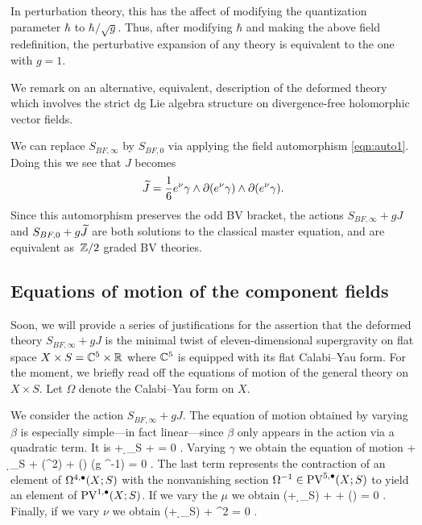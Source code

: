 In perturbation theory, this has the affect of modifying the quantization parameter $\hbar$ to $\hbar / \sqrt{g}$.
Thus, after modifying $\hbar$ and making the above field redefinition, the perturbative expansion of any theory is equivalent to the one with $g = 1$. 

\parsec[s:altdfn]

We remark on an alternative, equivalent, description of the deformed theory which involves the strict dg Lie algebra structure on divergence-free holomorphic vector fields.

We can replace $S_{BF,\infty}$ by $S_{BF,0}$ via applying the field automorphism \eqref{eqn:auto1}.
Doing this we see that $J$ becomes 
\[
\widetilde{J} = \frac16 e^\nu \gamma \wedge \partial (e^\nu \gamma) \wedge \partial(e^\nu \gamma) .
\]
Since this automorphism preserves the odd BV bracket, the actions $S_{BF,\infty} + g J$ and $S_{BF, 0} + g \widetilde{J}$ are both solutions to the classical master equation, and are equivalent as~$\mathbb Z/2$ graded BV theories.

\subsection{Equations of motion of the component fields} \label{s:components}

Soon, we will provide a series of justifications for the assertion that the deformed theory $S_{BF, \infty} + g J$ is the minimal twist of eleven-dimensional supergravity on flat space $X \times S = \mathbb C^5 \times \mathbb R$ where $\mathbb C^5$ is equipped with its flat Calabi--Yau form. 
For the moment, we briefly read off the equations of motion of the general theory on $X \times S$.
Let $\Omega$ denote the Calabi--Yau form on $X$. 

We consider the action $S_{BF, \infty} + gJ$.
The equation of motion obtained by varying $\beta$ is especially simple---in fact linear---since $\beta$ only appears in the action via a quadratic term. 
It is
\beqn\label{eqn:eombeta}
\dbar \nu + \d_S \nu + \div \mu = 0 .
\eeqn
Varying $\gamma$ we obtain the equation of motion
\beqn\label{eqn:eomgamma}
\dbar \mu + \d_S \mu +   \div (\mu^2) +  (\del \gamma \wedge \del \gamma) \vee (g \Omega^{-1}) = 0 .
\eeqn
The last term represents the contraction of an element of $\Omega^{4,\bullet}(X;S)$ with the nonvanishing section $\Omega^{-1} \in {\rm PV}^{5,\bullet}(X;S)$ to yield an element of ${\rm PV}^{1,\bullet}(X;S)$. 
If we vary the $\mu$ we obtain 
\beqn\label{eqn:eommu}
(\dbar + \d_S) \gamma + \del \beta +  (\mu \vee \del \gamma) = 0 .
\eeqn
Finally, if we vary $\nu$ we obtain
\beqn\label{eqn:eomnu}
(\dbar + \d_S) \beta +   \mu^2 \vee \del \gamma = 0 .
\eeqn

